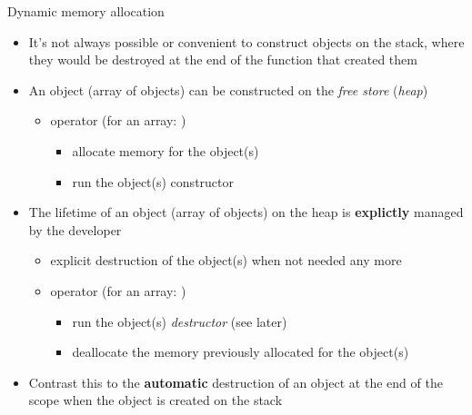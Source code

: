 \begin{frame}{Dynamic memory allocation}

  \begin{itemize}
  \item<1-> It's not always possible or convenient to construct objects on the
    stack, where they would be destroyed at the end of the function that created
    them
  \item<2-> An object (array of objects) can be constructed on the \textit{free
      store} (\textit{heap})
    \begin{itemize}
    \item operator  (for an array: )
      \begin{itemize}
      \item allocate memory for the object(s)
      \item run the object(s) constructor
      \end{itemize}
    \end{itemize}
  \item<3-> The lifetime of an object (array of objects) on the heap is
    \textbf{explictly} managed by the developer
    \begin{itemize}
    \item explicit destruction of the object(s) when not needed any more
    \item operator  (for an array: )
      \begin{itemize}
      \item run the object(s) \textit{destructor} (see later)
      \item deallocate the memory previously allocated for the object(s)
      \end{itemize}
    \end{itemize}
  \item<4-> Contrast this to the \textbf{automatic} destruction of an object at
    the end of the scope when the object is created on the stack
  \end{itemize}

\end{frame}

